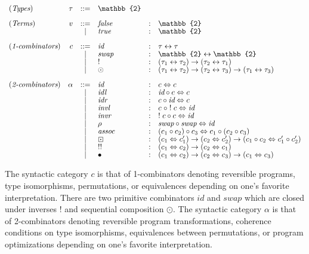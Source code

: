 \documentclass{entcs}
\newcommand{\swap}{\textit{swap}}
\newcommand{\id}{\textit{id}}
\newcommand{\compc}[2]{#1 \circ #2}
\newcommand{\alt}{~\mid~}
\newcommand{\invc}[1]{!\;#1}
\newcommand{\assocc}{\mathit{assoc}}
\newcommand{\invl}{\mathit{invl}}
\newcommand{\invr}{\mathit{invr}}
\newcommand{\idlc}{\mathit{idl}}
\newcommand{\idrc}{\mathit{idr}}
\newcommand{\iso}{\leftrightarrow}
\newcommand{\isotwo}{\Leftrightarrow}
\newcommand{\bt}{\mathbb{2}}
\newcommand{\fc}{\mathit{false}}
\newcommand{\tc}{\mathit{true}}
\begin{document}
\[\def\arraystretch{0.8}\begin{array}{l@{\quad}rclrl}
(\textit{Types}) & \tau &::=& \bt \\
\\
(\textit{Terms}) &  v &::=& \fc &:& \bt \\
              && \alt & \tc &:& \bt \\
\\
 (\textit{1-combinators}) &  c &::=& \id &:& \tau \iso \tau \\
               && \alt & \swap &:& \bt \iso \bt \\
               && \alt & ! &:& (\tau_1 \iso \tau_2) \to (\tau_2 \iso \tau_1) \\
               && \alt & \odot &:& (\tau_1 \iso \tau_2) \to (\tau_2 \iso \tau_3) \to (\tau_1 \iso \tau_3)  \\
\\
(\textit{2-combinators}) & \alpha &::=& \id &:& c \isotwo c \\
            && \alt & \idlc &:& \compc{\id}{c} \isotwo c \\
            && \alt & \idrc &:& \compc{c}{\id} \isotwo c \\
            && \alt & \invl &:& \compc{c\;}{\;\invc{c}} \isotwo \id \\
            && \alt & \invr &:& \compc{\invc{c}}{c} \isotwo \id \\
            && \alt & \rho &:& \swap \circ \swap \isotwo \id \\
            && \alt & \assocc &:&
                                  \compc{(\compc{c_1}{c_2})}{c_3} \isotwo \compc{c_1}{(\compc{c_2}{c_3})} \\
            && \alt & \boxdot &:& (c_1 \isotwo c_1') \to (c_2 \isotwo c_2') \to
                             (\compc{c_1}{c_2} \isotwo \compc{c_1'}{c_2'}) \\
            && \alt & !! &:& (c_1 \isotwo c_2) \to (c_2 \isotwo c_1) \\
            && \alt & \bullet &:& (c_1 \isotwo c_2) \to (c_2 \isotwo c_3) \to (c_1 \isotwo c_3)
\end{array}\]

The syntactic category $c$ is that of 1-combinators denoting
reversible programs, type isomorphisms, permutations, or equivalences
depending on one's favorite interpretation. There are two primitive
combinators $\id$ and $\swap$ which are closed under inverses $!$ and
sequential composition $\odot$. The syntactic category $\alpha$ is
that of 2-combinators denoting reversible program transformations,
coherence conditions on type isomorphisms, equivalences between
permutations, or program optimizations depending on one's favorite
interpretation.
\end{document}

